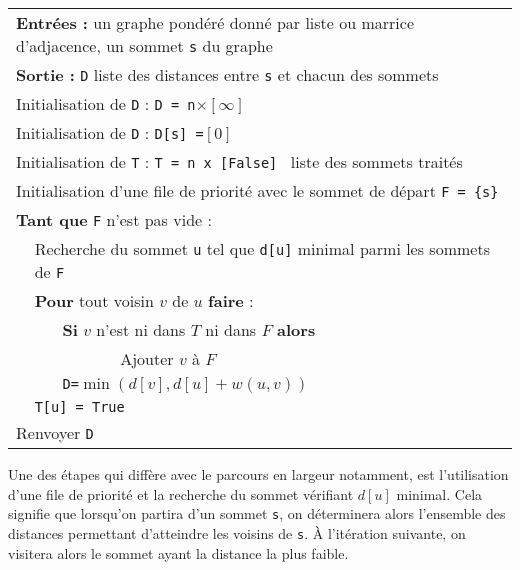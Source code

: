 \begin{center}
\begin{tabular}{|p{1cm}p{1cm}p{1cm}p{10cm}}
\multicolumn{4}{|p{12cm}}{\textbf{Entrées : }  un graphe pondéré donné par liste ou marrice d'adjacence, un sommet \texttt{s} du graphe}\\
\multicolumn{4}{|p{15cm}}{\textbf{Sortie : } \texttt{D} liste des distances entre \texttt{s} et chacun des sommets}\\
\multicolumn{4}{|p{15cm}}{Initialisation de \texttt{D} : \texttt{D = n}$\times [\infty]$ }\\
\multicolumn{4}{|p{15cm}}{Initialisation de \texttt{D} : \texttt{D[s] =}$[0]$ }\\
\multicolumn{4}{|p{15cm}}{Initialisation de \texttt{T} : \texttt{T = n x [False] } liste des sommets traités }\\
\multicolumn{4}{|p{15cm}}{Initialisation d'une file de priorité avec le sommet de départ \texttt{F = \{s\}}}\\
\multicolumn{4}{|p{15cm}}{\textbf{Tant que} \texttt{F} n'est pas vide :  }\\
& \multicolumn{3}{|p{15cm}}{Recherche du sommet \texttt{u} tel que \texttt{d[u]} minimal parmi les sommets de \texttt{F}}\\
& \multicolumn{3}{|p{15cm}}{\textbf{Pour} tout voisin $v$ de $u$ \textbf{faire} :}\\
&& \multicolumn{2}{|p{15cm}}{\textbf{Si} $v$ n'est ni dans $T$ ni dans $F$ \textbf{alors}}\\
&&& \multicolumn{1}{|p{15cm}}{Ajouter $v$ à $F$}\\
&& \multicolumn{2}{|p{15cm}}{\texttt{D=}$\min \left(d[v],d[u]+w(u,v)\right)$}\\
& \multicolumn{3}{|p{15cm}}{\texttt{T[u] =  True}}\\
\multicolumn{4}{|p{15cm}}{Renvoyer \texttt{D}}\\
\end{tabular}
\end{center}

Une des étapes qui diffère avec le parcours en largeur notamment, est l'utilisation d'une file de priorité et la recherche du sommet vérifiant $d[u]$ minimal. Cela signifie que lorsqu'on partira d'un sommet \texttt{s}, on déterminera alors l'ensemble des distances permettant d'atteindre les voisins de \texttt{s}. \`A l'itération suivante, on visitera alors le sommet ayant la distance la plus faible.

